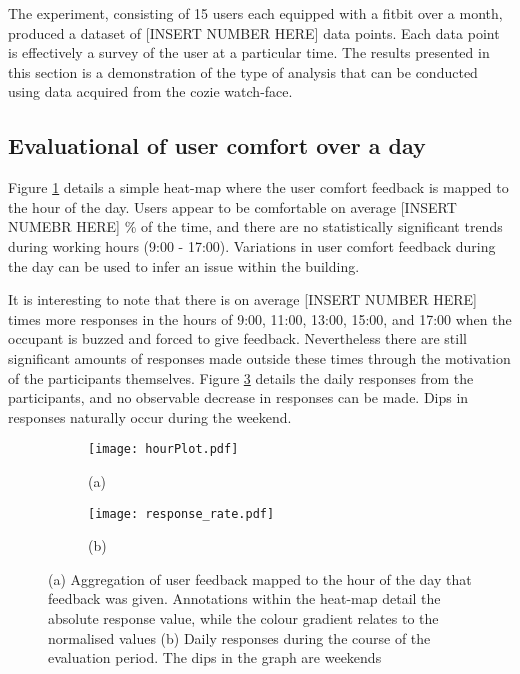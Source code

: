 
The experiment, consisting of 15 users each equipped with a fitbit over a month, produced a dataset of [INSERT NUMBER HERE] data points. Each data point is effectively a survey of the user at a particular time. The results presented in this section is a demonstration of the type of analysis that can be conducted using data acquired from the cozie watch-face.

\subsection{Evaluational of user comfort over a day}

Figure \ref{fig:hourPlot} details a simple heat-map where the user comfort feedback is mapped to the hour of the day. Users appear to be comfortable on average [INSERT NUMEBR HERE] \% of the time, and there are no statistically significant trends during working hours (9:00 - 17:00). Variations in user comfort feedback during the day can be used to infer an issue within the building.

It is interesting to note that there is on average [INSERT NUMBER HERE] times more responses in the hours of 9:00, 11:00, 13:00, 15:00, and 17:00 when the occupant is buzzed and forced to give feedback. Nevertheless there are still significant amounts of responses made outside these times through the motivation of the participants themselves. Figure \ref{fig:responseRate} details the daily responses from the participants, and no observable decrease in responses can be made. Dips in responses naturally occur during the weekend. 


\begin{figure}
\centering
	\begin{subfigure}[t]{0.5\textwidth}
	\texttt{[image: hourPlot.pdf]}
	\caption{(a)}
	\label{fig:hourPlot}
	\end{subfigure}
	\begin{subfigure}[t]{0.49\textwidth}
	\texttt{[image: response\_rate.pdf]}
	\caption{(b)}
	\label{fig:responseRate}
	\end{subfigure}
	\caption{(a) Aggregation of user feedback mapped to the hour of the day that feedback was given. Annotations within the heat-map detail the absolute response value, while the colour gradient relates to the normalised values (b) Daily responses during the course of the evaluation period. The dips in the graph are weekends}
\end{figure}


